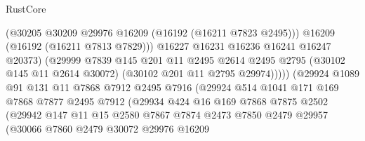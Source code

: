 \begin{lexlean}{RustCore}
\begin{coremodule}
                                      (@30205 @30209 @29976 @16209 (@16192 (@16211 @7823 @2495)))
                                      @16209
                                      (@16192 (@16211 @7813 @7829)))
                                    @16227
                                    @16231
                                    @16236
                                    @16241
                                    @16247
                                    @20373)
                                  (@29999
                                    @7839
                                    @145
                                    @201
                                    @11
                                    @2495
                                    @2614
                                    @2495
                                    @2795
                                    (@30102 @145 @11 @2614 @30072)
                                    (@30102 @201 @11 @2795 @29974)))))
                            (@29924
                              @1089
                              @91
                              @131
                              @11
                              @7868
                              @7912
                              @2495
                              @7916
                              (@29924
                                @514
                                @1041
                                @171
                                @169
                                @7868
                                @7877
                                @2495
                                @7912
                                (@29934
                                  @424
                                  @16
                                  @169
                                  @7868
                                  @7875
                                  @2502
                                  (@29942
                                    @147
                                    @11
                                    @15
                                    @2580
                                    @7867
                                    @7874
                                    @2473
                                    @7850
                                    @2479
                                    @29957
                                    (@30066
                                      @7860
                                      @2479
                                      @30072
                                      @29976
                                      @16209

\end{coremodule}
\end{lexlean}
